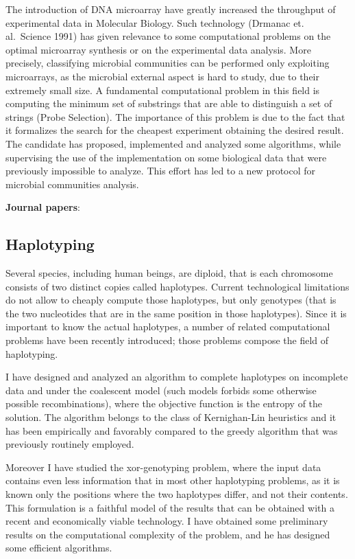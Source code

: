 \documentclass[11pt,a4paper,roman]{moderncv}
\begin{document}
The introduction of DNA microarray have greatly increased the throughput
of experimental data in Molecular Biology. Such technology (Drmanac et.
al.~Science 1991) has given relevance to some computational problems on
the optimal microarray synthesis or on the experimental data analysis.
More precisely, classifying microbial communities can be performed only
exploiting microarrays, as the microbial external aspect is hard to
study, due to their extremely small size. A fundamental computational
problem in this field is computing the minimum set of substrings that
are able to distinguish a set of strings (Probe Selection). The
importance of this problem is due to the fact that it formalizes the
search for the cheapest experiment obtaining the desired result. The
candidate has proposed, implemented and analyzed some algorithms, while
supervising the use of the implementation on some biological data that
were previously impossible to analyze. This effort has led to a new
protocol for microbial communities analysis.

\textbf{Journal
papers}:~\cite{DBLP:journals/bmcbi/RueggerVJB11,valinskyAnalysisBacterialCommunity2002,valinskyOligonucleotideFingerprintingRRNA2002,bornemanProbeSelectionAlgorithms2001}

\subsection{Haplotyping}\label{haplotyping}

Several species, including human beings, are diploid, that is each
chromosome consists of two distinct copies called haplotypes. Current
technological limitations do not allow to cheaply compute those
haplotypes, but only genotypes (that is the two nucleotides that are in
the same position in those haplotypes). Since it is important to know
the actual haplotypes, a number of related computational problems have
been recently introduced; those problems compose the field of
haplotyping.

I have designed and analyzed an algorithm to complete haplotypes on
incomplete data and under the coalescent model (such models forbids some
otherwise possible recombinations), where the objective function is the
entropy of the solution. The algorithm belongs to the class of
Kernighan-Lin heuristics and it has been empirically and favorably
compared to the greedy algorithm that was previously routinely employed.

Moreover I have studied the xor-genotyping problem, where the input data
contains even less information that in most other haplotyping problems,
as it is known only the positions where the two haplotypes differ, and
not their contents. This formulation is a faithful model of the results
that can be obtained with a recent and economically viable technology.
I have obtained some preliminary results on the computational complexity
of the problem, and he has designed some efficient algorithms.
\end{document}
